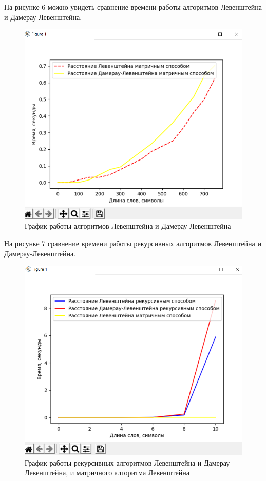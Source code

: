 \documentclass[a4paper,12pt]{article}
\begin{document}
На рисунке 6 можно увидеть сравнение времени работы алгоритмов Левенштейна и Дамерау-Левенштейна.
\begin{figure}[H]
	\centering
	\includegraphics[scale=0.6]{exp1.png} 
	\captionsetup{justification=centering}
	\caption{График работы алгоритмов Левенштейна и Дамерау-Левенштейна}
	\label{эксперимент1}
\end{figure}
На рисунке 7 сравнение времени работы рекурсивных алгоритмов Левенштейна и Дамерау-Левенштейна.
\begin{figure}[H]
	\centering
	\includegraphics[scale=0.6]{exp2.png} 
	\captionsetup{justification=centering}
	\caption{График работы рекурсивных алгоритмов Левенштейна и Дамерау-Левенштейна, и матричного алгоритма Левенштейна}
	\label{эксперимент2}
\end{figure}
\end{document}
